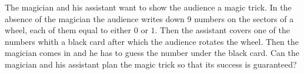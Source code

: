 \problem
The magician and his assistant want to show the audience a magic trick.
In the absence of the magician the audience writes down $9$ numbers
on the sectors of a wheel, each of them equal to either $0$ or $1$.
Then the assistant covers one of the numbers whith a black card after which
the audience rotates the wheel.
Then the magician comes in and he has to guess the number under the black card.
Can the magician and his assistant plan the magic trick so that its success
is guaranteed?
\solution
\endproblem
